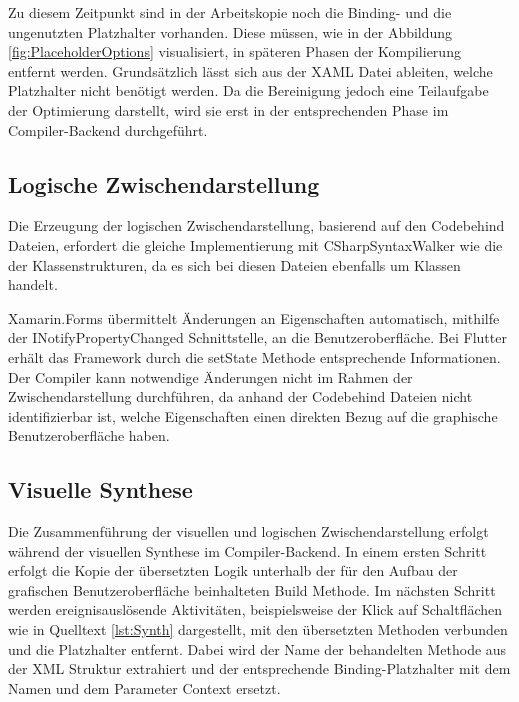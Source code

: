  

Zu diesem Zeitpunkt sind in der Arbeitskopie noch die Binding- und die ungenutzten Platzhalter vorhanden.  Diese müssen, wie in der Abbildung \ref{fig:PlaceholderOptions} visualisiert,  in späteren Phasen der Kompilierung entfernt werden.  Grundsätzlich lässt sich aus der XAML Datei ableiten,  welche Platzhalter nicht benötigt werden.  Da die Bereinigung jedoch eine Teilaufgabe der Optimierung darstellt, wird sie erst in der entsprechenden Phase im Compiler-Backend durchgeführt. 

\subsection{Logische Zwischendarstellung}

Die Erzeugung der logischen Zwischendarstellung,  basierend auf den Codebehind Dateien,  erfordert die gleiche Implementierung mit \glq CSharpSyntaxWalker\grq{} wie die der Klassenstrukturen,  da es sich bei diesen Dateien ebenfalls um \Csharp{} Klassen handelt.  

Xamarin.Forms übermittelt Änderungen an  Eigenschaften automatisch, mithilfe der \glq INotifyPropertyChanged\grq{}  Schnittstelle, an die Benutzeroberfläche.  Bei Flutter erhält das Framework durch die \glq setState\grq{}  Methode entsprechende Informationen.  Der Compiler kann notwendige Änderungen nicht im Rahmen der Zwischendarstellung durchführen, da anhand der Codebehind Dateien nicht identifizierbar ist, welche Eigenschaften einen direkten Bezug auf die graphische Benutzeroberfläche haben. 

\subsection{Visuelle Synthese}

Die Zusammenführung der visuellen und logischen Zwischendarstellung erfolgt während der visuellen Synthese im Compiler-Backend.  In einem ersten Schritt erfolgt die Kopie der übersetzten Logik unterhalb der für den Aufbau der grafischen Benutzeroberfläche beinhalteten \glq Build\grq{} Methode.  Im nächsten Schritt werden ereignisauslösende Aktivitäten,  beispielsweise der Klick auf Schaltflächen wie in Quelltext \ref{lst:Synth} dargestellt,  mit den übersetzten Methoden verbunden und die Platzhalter entfernt.  Dabei wird der Name der behandelten Methode aus der XML Struktur extrahiert und der entsprechende Binding-Platzhalter mit dem Namen und dem Parameter \glq Context\grq{} ersetzt. 


